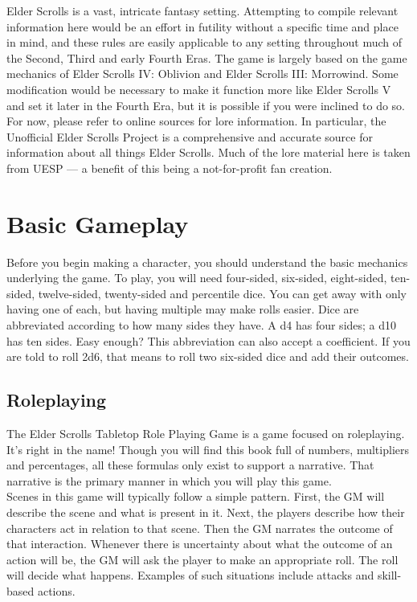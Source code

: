 \documentclass[12pt]{book}
\begin{document}
Elder Scrolls is a vast, intricate fantasy setting. Attempting to compile relevant information here would be an effort in futility without a specific time and place in mind, and these rules are easily applicable to any setting throughout much of the Second, Third and early Fourth Eras. The game is largely based on the game mechanics of Elder Scrolls IV: Oblivion and Elder Scrolls III: Morrowind. Some modification would be necessary to make it function more like Elder Scrolls V and set it later in the Fourth Era, but it is possible if you were inclined to do so. For now, please refer to online sources for lore information. In particular, the Unofficial Elder Scrolls Project is a comprehensive and accurate source for information about all things Elder Scrolls. Much of the lore material here is taken from UESP --- a benefit of this being a not-for-profit fan creation.
\newpage

\tableofcontents

\chapter{Basic Gameplay}
Before you begin making a character, you should understand the basic mechanics underlying the game. To play, you will need four-sided, six-sided, eight-sided, ten-sided, twelve-sided, twenty-sided and percentile dice. You can get away with only having one of each, but having multiple may make rolls easier. Dice are abbreviated according to how many sides they have. A d4 has four sides; a d10 has ten sides. Easy enough? This abbreviation can also accept a coefficient. If you are told to roll 2d6, that means to roll two six-sided dice and add their outcomes.

\section{Roleplaying}
The Elder Scrolls Tabletop Role Playing Game is a game focused on roleplaying. It's right in the name! Though you will find this book full of numbers, multipliers and percentages, all these formulas only exist to support a narrative. That narrative is the primary manner in which you will play this game.\\

Scenes in this game will typically follow a simple pattern. First, the GM will describe the scene and what is present in it. Next, the players describe how their characters act in relation to that scene. Then the GM narrates the outcome of that interaction. Whenever there is uncertainty about what the outcome of an action will be, the GM will ask the player to make an appropriate roll. The roll will decide what happens. Examples of such situations include attacks and skill-based actions.
\end{document}
